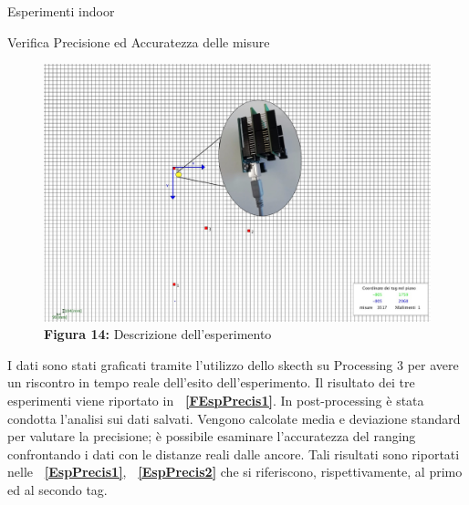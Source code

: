 \documentclass[12pt]{report}
\begin{document}
\begin{section}{Esperimenti indoor}
\begin{subsection}{Verifica Precisione ed Accuratezza delle misure}
			\begin{figure}[h]
				\centering
				\includegraphics[scale=0.55]{EspPrecis}
	 			\caption{\textbf{Figura 14:} Descrizione dell'esperimento\label{FEspPrecis}}
			\end{figure}
			I dati sono stati graficati tramite l’utilizzo dello skecth su Processing 3 per avere un riscontro in tempo reale dell’esito dell’esperimento. Il risultato dei tre esperimenti viene riportato in \textbf{\figurename~\ref{FEspPrecis1}}.
			In post-processing è stata condotta l’analisi sui dati salvati. Vengono calcolate media e deviazione standard per valutare la precisione; è possibile esaminare l’accuratezza del ranging confrontando i dati con le distanze reali dalle ancore. Tali risultati sono riportati nelle \textbf{\tablename~\ref{EspPrecis1}},  						\textbf{\tablename~\ref{EspPrecis2}} che si riferiscono, rispettivamente, al primo ed al secondo tag. 
			\begin{figure}[H]
				\centering

\end{figure}
\end{subsection}
\end{section}
\end{document}
